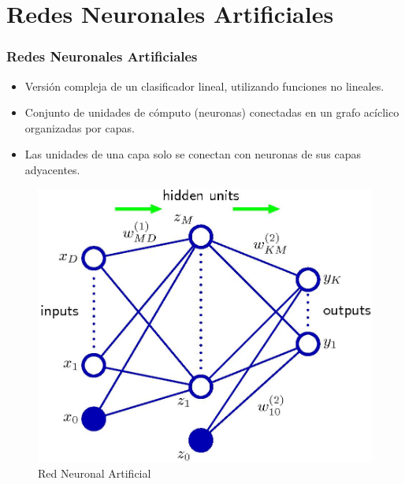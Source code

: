 \documentclass[10pt,center]{beamer}
\begin{document}
\section{Redes Neuronales Artificiales}
\begin{frame}
  \frametitle{Redes Neuronales Artificiales}
    \begin{itemize}
      \item Versión compleja de un clasificador lineal, utilizando funciones no lineales.
      \item Conjunto de unidades de cómputo (neuronas) conectadas en un grafo acíclico organizadas por capas. 
      \item Las unidades de una capa solo se conectan con neuronas de sus capas adyacentes.
    \end{itemize}

    \begin{figure}[ht]
      \begin{center}
	\includegraphics[height=0.5\textheight]{./img/bishop_neural_network.jpg}
      \end{center}
      \caption{Red Neuronal Artificial}
    \end{figure}
\end{frame}
\end{document}
